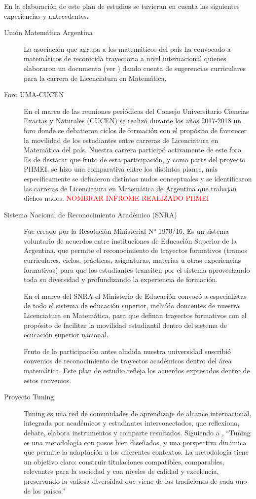 \documentclass[a4paper, 12pt]{article}
\begin{document}
En la elaboración de este plan de estudios se tuvieran en cuenta las siguientes experiencias y antecedentes.
\begin{description}
 \item[Unión Matemática Argentina]  La asociación que agrupa a los matemáticos del país ha convocado a matemáticos de reconicida trayectoria a nivel internacional quienes elaboraron un documento (ver \cite{uma}) 
 dando cuenta de sugerencias curriculares para la carrera de Licenciatura en Matemática.
 
 \item[Foro UMA-CUCEN] En el marco de las reuniones periódicas del Consejo Universitario Ciencias Exactas y Naturales (CUCEN) se realizó durante los años 2017-2018 un foro donde se debatieron ciclos de formación con el propósito de favorecer la movilidad de los estudiantes entre carreras de Licenciatura en Matemática del país. Nuestra carrera participó activamente de este foro. Es de destacar que fruto de esta participación, y como parte del proyecto PIIMEI, se hizo una comparativa entre los distintos planes, más específicamente se definieron distintas nudos conceptuales y se identificaron las carreras de Licenciatura en Matemática de Argentina que trabajan dichos nudos. \textcolor{red}{NOMBRAR INFROME REALIZADO PIIMEI}

\item[Sistema Nacional de Reconocimiento Académico (SNRA)] Fue creado por la Resolución Ministerial N° 1870/16. Es un sistema voluntario de acuerdos entre instituciones de Educación Superior de la Argentina, que permite el reconocimiento de trayectos formativos (tramos curriculares, ciclos, prácticas, asignaturas, materias u otras experiencias formativas) para que los estudiantes transiten por el sistema aprovechando toda su diversidad y profundizando la experiencia de formación.

En el marco del SNRA el Ministerio de Educación convocó a especialistas de todo el sistema de educación superior, incluído doncentes de nuestra Licenciatura en Matemática,  para que definan trayectos formativos con el propósito de facilitar la movilidad estudiantil dentro del sistema de ecucación superior nacional. 

Fruto de la participación antes aludida nuestra universidad suscribió convenios de reconocimiento de trayectos académicos dentro del área matemática. Este plan de estudio refleja los acuerdos expresados dentro de estos convenios.

\item[Proyecto Tuning] Tuning es una red de comunidades de aprendizaje de alcance internacional, integrada por académicos y estudiantes interconectados, que reflexiona, debate, elabora instrumentos
y comparte resultados. Siguiendo a \cite{paniagua2013educacion},
 ``Tuning es una metodología con pasos bien diseñados, y una perspectiva dinámica que permite la adaptación a los diferentes contextos. La metodología tiene un objetivo claro: construir titulaciones compatibles, comparables, relevantes para la sociedad y con niveles
de calidad y excelencia, preservando la valiosa diversidad que viene de las
tradiciones de cada uno de los países.'' 


\end{description}
\end{document}
